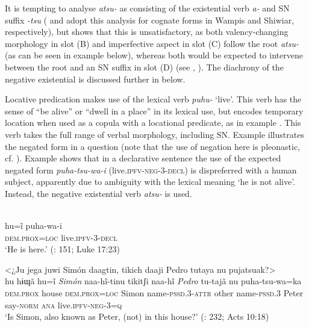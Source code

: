\documentclass[output=paper,colorlinks,citecolor=brown,draft]{langscibook}
\begin{document}
It is tempting to analyse \textit{atsu-} as consisting of the existential verb \textit{a-} and SN suffix \textit{\nobreakdash-tsu} (\citealt{Peña2015} and \citealt{Kohlberger2020} adopt this analysis for cognate forms in Wampis and Shiwiar, respectively), but \citet[407]{Overall2017a} shows that this is unsatisfactory, as both valency-changing morphology in slot (B) and imperfective aspect in slot (C) follow the root \textit{atsu-} (as can be seen in example  below), whereas both would be expected to intervene between the root and an SN suffix in slot (D) (see , ). The diachrony of the negative existential is discussed further in  below. 

Locative predication makes use of the lexical verb \textit{puhu-} ‘live’. This verb has the sense of “be alive” or “dwell in a place” in its lexical use, but encodes temporary location when used as a copula with a locational predicate, as in example . This verb takes the full range of verbal morphology, including SN. Example  illustrates the negated form in a question (note that the use of negation here is pleonastic, cf. ). Example  shows that in a declarative sentence the use of the expected negated form \textit{puha-tsu-wa-i} (live.\textsc{ipfv-neg-3-decl}) is dispreferred with a human subject, apparently due to ambiguity with the lexical meaning ‘he is not alive’. Instead, the negative existential verb \textit{atsu-} is used.

\ea\label{ex:agu:25}
     \\ 
          hu=ĩ  puha-wa-i \\
          \textsc{dem.prox=loc}  live.\textsc{ipfv-3-decl}\\
    \glt ‘He is here.’ (\citealt{LigaBíblica2008}: 151; Luke 17:23)
\z 

\ea\label{ex:agu:26}
    \glll <¿Ju jega juwi Simón daagtin, tikich daaji Pedro tutaya nu pujatsuak?>\\ 
          hu  hɨɰã  hu=ĩ  \textit{Simón} naa-hĩ-tinu  tikitʃi naa-hĩ  \textit{Pedro}  tu-tajã  nu  puha-tsu-wa=ka\\
          \textsc{dem.prox}  house  \textsc{dem.prox=loc}  Simon  name-\textsc{pssd.3-attr}  other name-\textsc{pssd.3}  Peter  say-\textsc{norm}  \textsc{ana}  live.\textsc{ipfv-neg-3=q}\\
    \glt ‘Is Simon, also known as Peter, (not) in this house?’ (\citealt{LigaBíblica2008}: 232; Acts 10:18)
\z 
\end{document}
